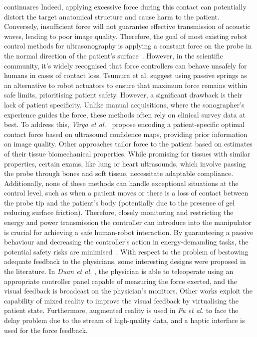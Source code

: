 \TODO continuares
Indeed, applying excessive force during this contact can potentially distort the target anatomical structure and cause harm to the patient. Conversely, insufficient force will not guarantee effective transmission of
acoustic waves, leading to poor image quality. Therefore, the goal of
most existing robot control methods for ultrasonography is applying a
constant force on the probe in the normal direction of the patient's surface~\cite{merouche2016robotic, hennersperger2017towards,
tsumura2020robotic}. However, in the scientific community, it's widely recognised that force controllers can behave unsafely for humans in cases of contact loss. Tsumura et al. \cite{tsumura2020robotic} suggest using passive springs as an alternative to robot actuators to ensure that maximum force remains within safe limits, prioritising patient safety. However, a significant drawback is their lack of patient specificity. Unlike manual acquisitions, where the sonographer's experience guides the force, these methods often rely on clinical survey data at best. To address this, \textit{Virga et al.}~\cite{virga2016automatic} propose encoding a patient-specific optimal contact force based on ultrasound confidence maps, providing prior information on image quality. Other approaches tailor force to the patient based on estimates of their tissue biomechanical properties. While promising for tissues with similar properties, certain exams, like lung or heart ultrasounds, which involve passing the probe through bones and soft tissue, necessitate adaptable compliance. 
Additionally, none of these methods can handle exceptional situations at the control level, such as when a patient moves or there is a loss of contact between the probe tip and the patient's body (potentially due to the presence of gel reducing surface friction). Therefore, closely monitoring and restricting the energy and power transmission the controller can introduce into the manipulator is crucial for achieving a safe human-robot interaction. %
By guaranteeing a passive behaviour and decreasing the
controller's action in energy-demanding tasks, the potential safety risks are minimised~\cite{ferraguti2015energy,raiola2018development,shahriari2020power,
lachner2021energy,hjorth2023design}. 
With respect to the problem of bestowing adequate feedback to the physicians, some interesting designs were proposed in the literature. In \textit{Duan et al.} \cite{duan2021tele}, the physician is able to teleoperate using an appropriate controller panel capable of measuring the force exerted, and the visual feedback is broadcast on the physician's monitors. Other works exploit the capability of mixed reality \cite{black2023mixed} to improve the visual feedback by virtualising the patient state. Furthermore, augmented reality is used in \textit{Fu et al.} \cite{fu2023robot} to face the delay problem due to the stream of high-quality data, and a haptic interface is used for the force feedback.



